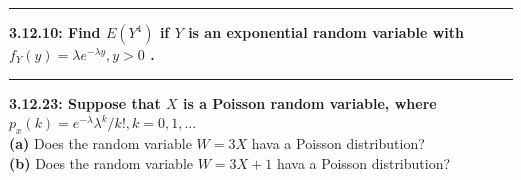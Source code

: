 \documentclass[11pt]{article}
\newcommand\question[2]{\vspace{.25in}\hrule\textbf{#1: #2}\vspace{.5em}\vspace{.10in}}
\renewcommand\part[1]{\vspace{.10in}\textbf{(#1)}}
\begin{document}
\question{3.12.10}
{Find $E(Y^{4})$ if $Y$ is an exponential random variable with
$f_{Y}(y) = \lambda e^{- \lambda y}, y>0$
.}


\question{3.12.23}
{Suppose that $X$ is a Poisson random variable, where
$p_{x}(k) = e^{-\lambda}\lambda^{k}/k!,k=0,1,...$}
\\
\part{a}
{Does the random variable $W = 3X$ hava a Poisson distribution?}
\\ 
\part{b}
{Does the random variable $W = 3X+1$ hava a Poisson distribution?}
\end{document}
